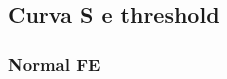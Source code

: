 \documentclass[10pt,a4paper,twoside]{report}
\begin{document}
\subsection{Curva S e threshold}

\begin{comment}
Per poter ottenere il valore della threshold per ogni pixel, ciascuno di essi deve essere iniettato un numero arbitrario di volte (noi abbiamo scelto 100), per ogni valore di impulso di iniezione compreso tra un valore minimo, scelto settando il registro del chip ''\textbf{VL}'' e un valore massimo, per mezzo del registro ''\textbf{VH}'', con step a scelta da noi settato a 1.
Fissato il valore dell'impulso di iniezione, si considera la media dei 100 output ottenuti. Così facendo, per ogni pixel, si ottiene la tipica curva nota come ''\textit{S-curve}'', che matematicamente è una error function (?) e da cui si stima il valore della threshold, prendendo il valore di carica iniettata per la quale la curva è a metà della sua altezza massima. Plottando il numero di hit rilevate su ciascun pixel diviso il numero totale, per ogni valore di carica iniettata, la metà altezza corrisponde al valore di carica per la quale il pixel rileva 50 hit su 100 totali iniettate e cioè ha un'occupancy di 0.50.

SPIEGARE METODO DI LUDOVICO????

METTI FIGURA
\begin{figure}
\centering
\texttt{[image: ]}
\caption{Esempio di S-curve e stima della threshold}
\label{ex_scurve}
\end{figure}

\end{comment}

\subsubsection{Normal FE}
\end{document}
